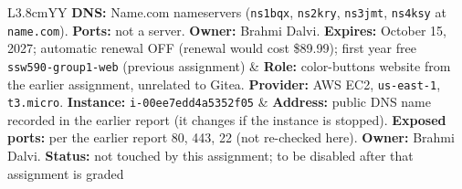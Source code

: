 \begin{tabularx}{\linewidth}{L{3.8cm}YY}
\small \textbf{DNS:} Name.com nameservers (\texttt{ns1bqx}, \texttt{ns2kry}, \texttt{ns3jmt}, \texttt{ns4ksy} at \texttt{name.com}).\newline
\textbf{Ports:} not a server.\newline
\textbf{Owner:} Brahmi Dalvi.\newline
\textbf{Expires:} October 15, 2027; automatic renewal OFF (renewal would cost \$89.99); first year free\\
\small \texttt{ssw590-group1-web} (previous assignment) &
\small \textbf{Role:} color-buttons website from the earlier assignment, unrelated to Gitea.\newline
\textbf{Provider:} AWS EC2, \texttt{us-east-1}, \texttt{t3.micro}.\newline
\textbf{Instance:} \texttt{i-00ee7edd4a5352f05} &
\small \textbf{Address:} public DNS name recorded in the earlier report (it changes if the instance is stopped).\newline
\textbf{Exposed ports:} per the earlier report 80, 443, 22 (not re-checked here).\newline
\textbf{Owner:} Brahmi Dalvi.\newline
\textbf{Status:} not touched by this assignment; to be disabled after that assignment is graded\\
\end{tabularx}

